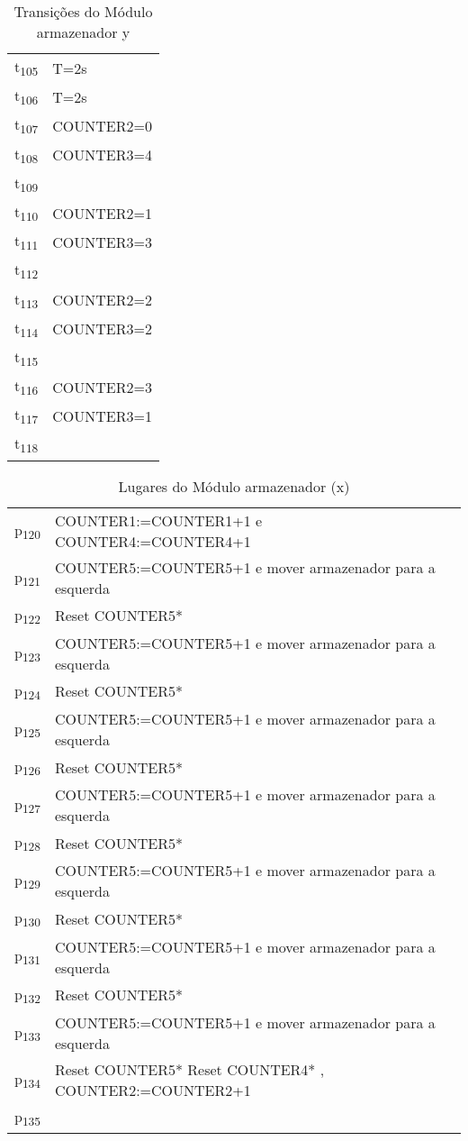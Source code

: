 \begin{table}[htbp]
\caption{Transições do Módulo armazenador y}
\centering
\begin{tabular}{ll}
t\textsubscript{105} & T=2s\\
t\textsubscript{106} & T=2s\\
t\textsubscript{107} & COUNTER2=0\\
t\textsubscript{108} & COUNTER3=4\\
t\textsubscript{109} & \\
t\textsubscript{110} & COUNTER2=1\\
t\textsubscript{111} & COUNTER3=3\\
t\textsubscript{112} & \\
t\textsubscript{113} & COUNTER2=2\\
t\textsubscript{114} & COUNTER3=2\\
t\textsubscript{115} & \\
t\textsubscript{116} & COUNTER2=3\\
t\textsubscript{117} & COUNTER3=1\\
t\textsubscript{118} & \\
\end{tabular}
\end{table}
\begin{table}[htbp]
\caption{Lugares do Módulo armazenador (x)}
\centering
\begin{tabular}{ll}
p\textsubscript{120} & COUNTER1:=COUNTER1+1 e COUNTER4:=COUNTER4+1\\
p\textsubscript{121} & COUNTER5:=COUNTER5+1 e mover armazenador para a esquerda\\
p\textsubscript{122} & Reset COUNTER5*\\
p\textsubscript{123} & COUNTER5:=COUNTER5+1 e mover armazenador para a esquerda\\
p\textsubscript{124} & Reset COUNTER5*\\
p\textsubscript{125} & COUNTER5:=COUNTER5+1 e mover armazenador para a esquerda\\
p\textsubscript{126} & Reset COUNTER5*\\
p\textsubscript{127} & COUNTER5:=COUNTER5+1 e mover armazenador para a esquerda\\
p\textsubscript{128} & Reset COUNTER5*\\
p\textsubscript{129} & COUNTER5:=COUNTER5+1 e mover armazenador para a esquerda\\
p\textsubscript{130} & Reset COUNTER5*\\
p\textsubscript{131} & COUNTER5:=COUNTER5+1 e mover armazenador para a esquerda\\
p\textsubscript{132} & Reset COUNTER5*\\
p\textsubscript{133} & COUNTER5:=COUNTER5+1 e mover armazenador para a esquerda\\
p\textsubscript{134} & Reset COUNTER5* Reset COUNTER4* , COUNTER2:=COUNTER2+1\\
p\textsubscript{135} & \\
\end{tabular}
\end{table}


